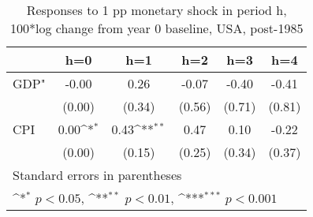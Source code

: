 \begin{table}[htbp]\centering
\def\sym#1{\ifmmode^{#1}\else\(^{#1}\)\fi}
\caption{Responses to 1 pp monetary shock in period h, 100*log change from year 0 baseline, USA, post-1985}
\begin{tabular}{l*{5}{c}}
\hline\hline
            &\multicolumn{1}{c}{h=0}&\multicolumn{1}{c}{h=1}&\multicolumn{1}{c}{h=2}&\multicolumn{1}{c}{h=3}&\multicolumn{1}{c}{h=4}\\
\hline
GDP"        &       -0.00         &        0.26         &       -0.07         &       -0.40         &       -0.41         \\
            &      (0.00)         &      (0.34)         &      (0.56)         &      (0.71)         &      (0.81)         \\
[1em]
CPI         &        0.00\sym{*}  &        0.43\sym{**} &        0.47         &        0.10         &       -0.22         \\
            &      (0.00)         &      (0.15)         &      (0.25)         &      (0.34)         &      (0.37)         \\
\hline\hline
\multicolumn{6}{l}{\footnotesize Standard errors in parentheses}\\
\multicolumn{6}{l}{\footnotesize \sym{*} \(p<0.05\), \sym{**} \(p<0.01\), \sym{***} \(p<0.001\)}\\
\end{tabular}
\end{table}

